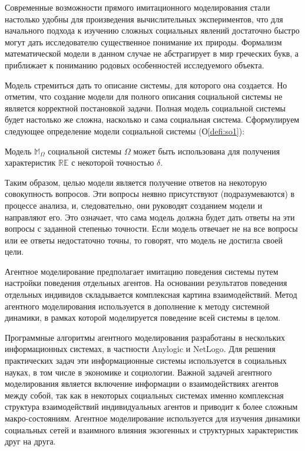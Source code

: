 Современные возможности прямого имитационного моделирования стали настолько удобны для произведения вычислительных экспериментов, что для начального подхода к изучению сложных социальных явлений достаточно быстро могут дать исследователю существенное понимание их природы. Формализм математической модели в данном случае не абстрагирует в мир греческих букв, а приближает к пониманию родовых особенностей исследуемого объекта.

Модель стремиться дать то описание системы, для которого она создается. 
Но отметим, что создание модели для полного описания социальной системы не является корректной постановкой задачи. 
Полная модель социальной системы будет настолько же сложна, насколько и сама социальная система. 
Сформулируем следующее определение модели социальной системы (О\ref{defi:so1}):

\begin{defi} \label{defi:so1}
Модель  $\mathbb{M}_{\Omega}$ социальной системы $\Omega$ может быть использована для получения характеристик $\mathbb{RE}$ с некоторой точностью $\delta$.
\end{defi}

Таким образом, целью модели является получение ответов на некоторую совокупность вопросов. 
Эти вопросы неявно присутствуют (подразумеваются) в процессе анализа, и, следовательно, они руководят созданием модели и направляют его. 
Это означает, что сама модель должна будет дать ответы на эти вопросы с заданной степенью точности. 
Если модель отвечает не на все вопросы или ее ответы недостаточно точны, то говорят, что модель не достигла своей цели.

Агентное моделирование предполагает имитацию поведения системы путем настройки поведения отдельных агентов. 
На основании результатов поведения отдельных индивидов складывается комплексная картина взаимодействий. 
Метод агентного моделирования используется в дополнение к методу системной динамики, в рамках которой моделируется поведение всей системы в целом.

Программные алгоритмы агентного моделирования разработаны в нескольких информационных системах, в частности Anylogic и NetLogo.
Для решения практических задач эти информационные системы используется в социальных науках, в том числе в экономике и социологии. 
Важной задачей агентного моделирования является включение информации о взаимодействиях агентов между собой, так как в некоторых социальных системах именно комплексная структура взаимодействий индивидуальных агентов и приводит к более сложным макро-состояниям. 
Агентное моделирование используется для изучения динамики социальных сетей и взаимного влияния экзогенных и структурных характеристик друг на друга.

